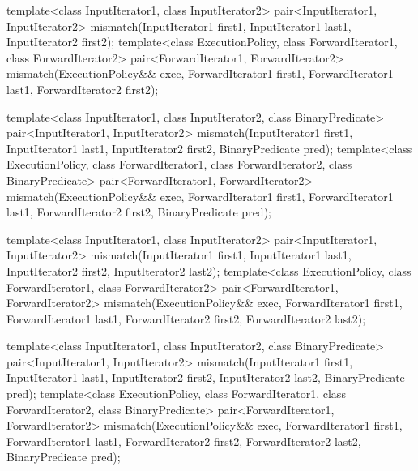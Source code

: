 %
\begin{itemdecl}
template<class InputIterator1, class InputIterator2>
  pair<InputIterator1, InputIterator2>
      mismatch(InputIterator1 first1, InputIterator1 last1,
               InputIterator2 first2);
template<class ExecutionPolicy, class ForwardIterator1, class ForwardIterator2>
  pair<ForwardIterator1, ForwardIterator2>
    mismatch(ExecutionPolicy&& exec,
             ForwardIterator1 first1, ForwardIterator1 last1,
             ForwardIterator2 first2);

template<class InputIterator1, class InputIterator2,
         class BinaryPredicate>
  pair<InputIterator1, InputIterator2>
      mismatch(InputIterator1 first1, InputIterator1 last1,
               InputIterator2 first2, BinaryPredicate pred);
template<class ExecutionPolicy, class ForwardIterator1, class ForwardIterator2,
         class BinaryPredicate>
  pair<ForwardIterator1, ForwardIterator2>
    mismatch(ExecutionPolicy&& exec,
             ForwardIterator1 first1, ForwardIterator1 last1,
             ForwardIterator2 first2, BinaryPredicate pred);

template<class InputIterator1, class InputIterator2>
  pair<InputIterator1, InputIterator2>
    mismatch(InputIterator1 first1, InputIterator1 last1,
             InputIterator2 first2, InputIterator2 last2);
template<class ExecutionPolicy, class ForwardIterator1, class ForwardIterator2>
  pair<ForwardIterator1, ForwardIterator2>
    mismatch(ExecutionPolicy&& exec,
             ForwardIterator1 first1, ForwardIterator1 last1,
             ForwardIterator2 first2, ForwardIterator2 last2);

template<class InputIterator1, class InputIterator2,
         class BinaryPredicate>
  pair<InputIterator1, InputIterator2>
    mismatch(InputIterator1 first1, InputIterator1 last1,
             InputIterator2 first2, InputIterator2 last2,
             BinaryPredicate pred);
template<class ExecutionPolicy, class ForwardIterator1, class ForwardIterator2,
         class BinaryPredicate>
  pair<ForwardIterator1, ForwardIterator2>
    mismatch(ExecutionPolicy&& exec,
             ForwardIterator1 first1, ForwardIterator1 last1,
             ForwardIterator2 first2, ForwardIterator2 last2,
             BinaryPredicate pred);
\end{itemdecl}

